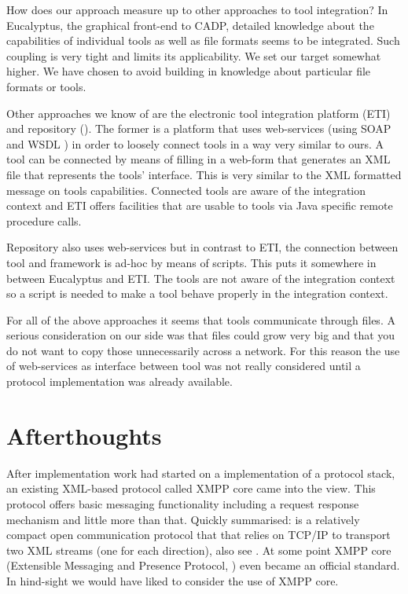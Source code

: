 \documentclass{article}
\begin{document}
   How does our approach measure up to other approaches to tool integration?  In
   Eucalyptus, the graphical front-end to CADP, detailed knowledge about the
   capabilities of individual tools as well as file formats seems to be
   integrated. Such coupling is very tight and limits its applicability. We set
   our target somewhat higher. We have chosen to avoid building in knowledge
   about particular file formats or tools.
   
   Other approaches we know of are the electronic tool integration platform
   (ETI) \cite{RICVT} and repository (\cite{SFAV}). The former is a platform
   that uses web-services (using SOAP \cite{SOAP} and WSDL \cite{2001-WSDL})
   in order to loosely connect tools in a way very similar to ours. A tool can
   be connected by means of filling in a web-form that generates an XML file
   that represents the tools' interface.  This is very similar to the XML
   formatted message on tools capabilities. Connected tools are aware of the
   integration context and ETI offers facilities that are usable to tools via
   Java specific remote procedure calls.
   
   Repository also uses web-services but in contrast to ETI, the connection
   between tool and framework is ad-hoc by means of scripts. This puts it
   somewhere in between Eucalyptus and ETI. The tools are not aware of the
   integration context so a script is needed to make a tool behave properly in
   the integration context.
 
   For all of the above approaches it seems that tools communicate through
   files.  A serious consideration on our side was that files could grow very
   big and that you do not want to copy those unnecessarily across a network.
   For this reason the use of web-services as interface between tool was not
   really considered until a protocol implementation was already available.

  \section{Afterthoughts}

   After implementation work had started on a implementation of a protocol
   stack, an existing XML-based protocol called XMPP core came into the view.
   This protocol offers basic messaging functionality including a request
   response mechanism and little more than that.  Quickly summarised: is a
   relatively compact open communication protocol that that relies on TCP/IP to
   transport two XML streams (one for each direction), also see
   \cite{Sperberg-McQueen:06:EML}.  At some point XMPP core (Extensible
   Messaging and Presence Protocol, \cite{rfc3920}) even became an official
   standard. In hind-sight we would have liked to consider the use of XMPP
   core.
\end{document}
